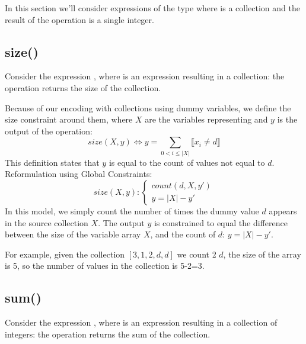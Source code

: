 In this section we'll consider expressions of the type  where  is a collection and the result of the operation is a single integer.


\subsection{size()}
Consider the expression , where  is an expression resulting in a collection: the  operation returns the size of the  collection.

Because of our encoding with collections using dummy variables, we define the size constraint around them, where $X$ are the variables representing  and $y$ is the output of the  operation: 
\begin{equation}\label{def:size}
    size(X,y) \iff y = \sum_{0 < i \leq |X|} \llbracket x_i \neq d \rrbracket
\end{equation}
This definition states that $y$ is equal to the count of values not equal to $d$.
Reformulation using Global Constraints:
\begin{equation}\label{csp:size}
    size(X,y):
    \begin{cases}
        count(d,X,y') \\
        y = |X|-y'
    \end{cases}
\end{equation}
In this model, we simply count the number of times the dummy value $d$ appears in the source collection $X$.
The output $y$ is constrained to equal the difference between the size of the variable array $X$, and the count of $d$: $y = |X|-y'$.

For example, given the collection $[3,1,2,d,d]$ we count 2 $d$, the size of the array is 5, so the number of values in the collection is 5-2=3. 

\subsection{sum()}
Consider the expression , where  is an expression resulting in a collection of integers: the  operation returns the sum of the  collection.

